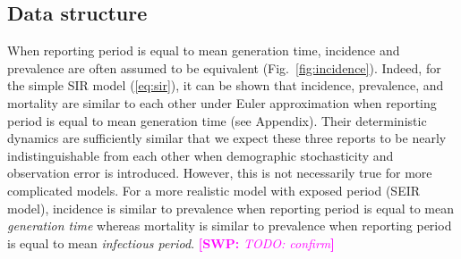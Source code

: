 \documentclass{article}
\newcommand{\eref}[1]{(\ref{eq:#1})}
\newcommand{\fref}[1]{Fig.~\ref{fig:#1}}
\newcommand{\comment}[3]{\textcolor{#1}{\textbf{[#2: }\textsl{#3}\textbf{]}}}
\newcommand{\swp}[1]{\comment{magenta}{SWP}{#1}}
\begin{document}
\subsection{Data structure}

When reporting period is equal to mean generation time, incidence and prevalence are often assumed to be equivalent (\fref{incidence}).
Indeed, for the simple SIR model \eref{sir}, it can be shown that incidence, prevalence, and mortality are similar to each other under Euler approximation when reporting period is equal to mean generation time (see Appendix).
Their deterministic dynamics are sufficiently similar that we expect these three reports to be nearly indistinguishable from each other when demographic stochasticity and observation error is introduced.
However, this is not necessarily true for more complicated models.
For a more realistic model with exposed period (SEIR model), incidence is similar to prevalence when reporting period is equal to mean \emph{generation time} whereas mortality is similar to prevalence when reporting period is equal to mean \emph{infectious period}. \swp{TODO: confirm}
\end{document}

